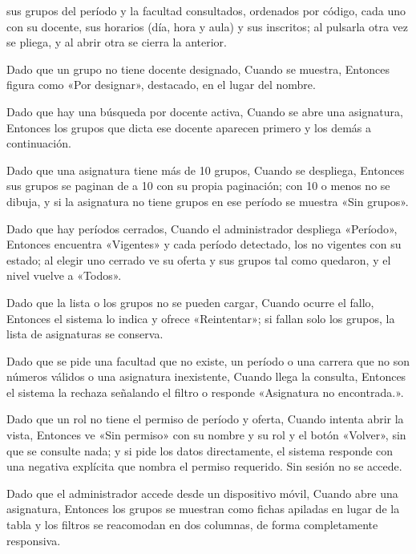 {      sus grupos del período y la facultad consultados, ordenados por código, cada uno
      con su docente, sus horarios (día, hora y aula) y sus inscritos; al pulsarla otra
      vez se pliega, y al abrir otra se cierra la anterior.
\item Dado que un grupo no tiene docente designado, Cuando se muestra, Entonces figura
      como «Por designar», destacado, en el lugar del nombre.
\item Dado que hay una búsqueda por docente activa, Cuando se abre una asignatura,
      Entonces los grupos que dicta ese docente aparecen primero y los demás a
      continuación.
\item Dado que una asignatura tiene más de 10 grupos, Cuando se despliega, Entonces sus
      grupos se paginan de a 10 con su propia paginación; con 10 o menos no se dibuja, y
      si la asignatura no tiene grupos en ese período se muestra «Sin grupos».
\item Dado que hay períodos cerrados, Cuando el administrador despliega «Período»,
      Entonces encuentra «Vigentes» y cada período detectado, los no vigentes con su
      estado; al elegir uno cerrado ve su oferta y sus grupos tal como quedaron, y el
      nivel vuelve a «Todos».
\item Dado que la lista o los grupos no se pueden cargar, Cuando ocurre el fallo,
      Entonces el sistema lo indica y ofrece «Reintentar»; si fallan solo los grupos, la
      lista de asignaturas se conserva.
\item Dado que se pide una facultad que no existe, un período o una carrera que no son
      números válidos o una asignatura inexistente, Cuando llega la consulta, Entonces
      el sistema la rechaza señalando el filtro o responde «Asignatura no encontrada.».
\item Dado que un rol no tiene el permiso de período y oferta, Cuando intenta abrir la
      vista, Entonces ve «Sin permiso» con su nombre y su rol y el botón «Volver», sin
      que se consulte nada; y si pide los datos directamente, el sistema responde con
      una negativa explícita que nombra el permiso requerido. Sin sesión no se accede.
\item Dado que el administrador accede desde un dispositivo móvil, Cuando abre una
      asignatura, Entonces los grupos se muestran como fichas apiladas en lugar de la
      tabla y los filtros se reacomodan en dos columnas, de forma completamente
      responsiva.}

\def\HUMockupsExtra{%
\CajaMockup{hu17-grupos}{7.8cm} & \CajaMockup{hu17-grupos-movil}{3.3cm}}

